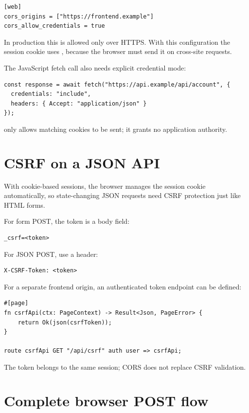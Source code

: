 \begin{lstlisting}
[web]
cors_origins = ["https://frontend.example"]
cors_allow_credentials = true
\end{lstlisting}

In production this is allowed only over HTTPS. With this configuration the session cookie uses , because the browser must send it on cross-site requests.

The JavaScript fetch call also needs explicit credential mode:

\begin{lstlisting}
const response = await fetch("https://api.example/api/account", {
  credentials: "include",
  headers: { Accept: "application/json" }
});
\end{lstlisting}

 only allows matching cookies to be sent; it grants no application authority.

\section{CSRF on a JSON API}

With cookie-based sessions, the browser manages the session cookie automatically, so state-changing JSON requests need CSRF protection just like HTML forms.

For form POST, the token is a body field:

\begin{lstlisting}
_csrf=<token>
\end{lstlisting}

For JSON POST, use a header:

\begin{lstlisting}
X-CSRF-Token: <token>
\end{lstlisting}

For a separate frontend origin, an authenticated token endpoint can be defined:

\begin{lstlisting}[language=Velran]
#[page]
fn csrfApi(ctx: PageContext) -> Result<Json, PageError> {
    return Ok(json(csrfToken));
}

route csrfApi GET "/api/csrf" auth user => csrfApi;
\end{lstlisting}

The token belongs to the same session; CORS does not replace CSRF validation.

\section{Complete browser POST flow}


